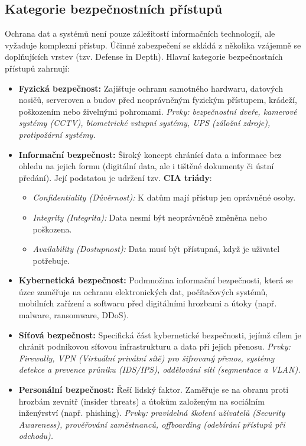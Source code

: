 \subsection{Kategorie bezpečnostních přístupů}

Ochrana dat a systémů není pouze záležitostí informačních technologií, ale vyžaduje komplexní přístup. Účinné zabezpečení se skládá z několika vzájemně se doplňujících vrstev (tzv. Defense in Depth). Hlavní kategorie bezpečnostních přístupů zahrnují:

\begin{itemize}
    \item \textbf{Fyzická bezpečnost:} Zajišťuje ochranu samotného hardwaru, datových nosičů, serveroven a budov před neoprávněným fyzickým přístupem, krádeží, poškozením nebo živelnými pohromami. \textit{Prvky: bezpečnostní dveře, kamerové systémy (CCTV), biometrické vstupní systémy, UPS (záložní zdroje), protipožární systémy.}

    \item \textbf{Informační bezpečnost:} Široký koncept chránící data a informace bez ohledu na jejich formu (digitální data, ale i tištěné dokumenty či ústní předání). Její podstatou je udržení tzv. \textbf{CIA triády}:
    \begin{itemize}
        \item \textit{Confidentiality (Důvěrnost):} K datům mají přístup jen oprávněné osoby.
        \item \textit{Integrity (Integrita):} Data nesmí být neoprávněně změněna nebo poškozena.
        \item \textit{Availability (Dostupnost):} Data musí být přístupná, když je uživatel potřebuje.
    \end{itemize}

    \item \textbf{Kybernetická bezpečnost:} Podmnožina informační bezpečnosti, která se úzce zaměřuje na ochranu elektronických dat, počítačových systémů, mobilních zařízení a softwaru před digitálními hrozbami a útoky (např. malware, ransomware, DDoS).

    \item \textbf{Síťová bezpečnost:} Specifická část kybernetické bezpečnosti, jejímž cílem je chránit podnikovou síťovou infrastrukturu a data při jejich přenosu. \textit{Prvky: Firewally, VPN (Virtuální privátní sítě) pro šifrovaný přenos, systémy detekce a prevence průniku (IDS/IPS), oddělování sítí (segmentace a VLAN).}

    \item \textbf{Personální bezpečnost:} Řeší lidský faktor. Zaměřuje se na obranu proti hrozbám zevnitř (insider threats) a útokům založeným na sociálním inženýrství (např. phishing). \textit{Prvky: pravidelná školení uživatelů (Security Awareness), prověřování zaměstnanců, offboarding (odebírání přístupů při odchodu).}


\end{itemize}
